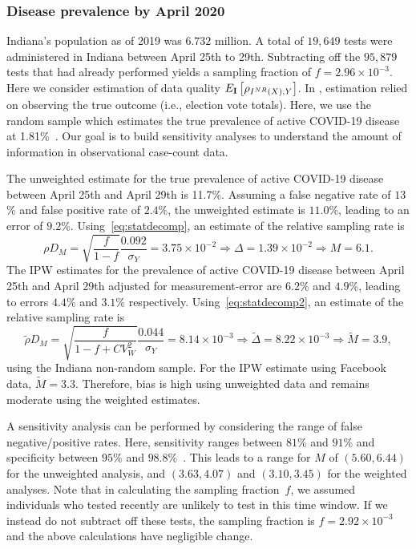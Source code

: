 \documentclass[11pt]{amsart}
\numberwithin{equation}{section}
\theoremstyle{plain}
\def\I{\bf I}
\begin{document}
 \subsubsection{Disease prevalence by April 2020}

 Indiana's population as of 2019 was $6.732$ million.  A total of $19,649$ tests were administered in Indiana between April 25th to 29th. Subtracting off the $95,879$ tests that had already performed yields a sampling fraction of $f = 2.96 \times 10^{-3}$. Here we consider estimation of data quality $E_{\I} \left[ \rho_{I^{NR} (X),Y} \right]$. In \cite{Meng2018}, estimation relied on observing the true outcome (i.e., election vote totals). Here, we use the random sample which estimates the true prevalence of active COVID-19 disease at 1.81\%~\cite{Yiannoutsos2021}.  Our goal is to build sensitivity analyses to understand the amount of information in observational case-count data.

 The unweighted estimate for the true prevalence of active COVID-19 disease between April 25th and April 29th is 11.7\%.  Assuming a false negative rate of $13$\% and false positive rate of $2.4$\%, the unweighted estimate is $11.0$\%, leading to an error of $9.2$\%.  Using~\eqref{eq:statdecomp}, an estimate of the relative sampling rate is
 \begin{equation*}
 \rho D_M = \sqrt{\frac{f}{1-f}} \frac{\text{0.092}}{\sigma_Y} = 3.75 \times 10^{-2} \Rightarrow \Delta = 1.39 \times 10^{-2} \Rightarrow M = 6.1.
 \end{equation*}
 The IPW estimates for the prevalence of active COVID-19 disease between April 25th and April 29th adjusted for measurement-error are $6.2$\% and $4.9$\%, leading to errors $4.4$\% and $3.1$\% respectively.  Using~\eqref{eq:statdecomp2}, an estimate of the relative sampling rate is
 \begin{equation*}
 \tilde \rho D_M = \sqrt{\frac{f}{1-f+CV_W^2}} \frac{\text{0.044}}{\sigma_Y} = 8.14 \times 10^{-3} \Rightarrow \tilde \Delta = 8.22 \times 10^{-3}  \Rightarrow \tilde M = 3.9,
 \end{equation*}
 using the Indiana non-random sample.  For the IPW estimate using Facebook data, $\tilde M = 3.3$. Therefore, bias is high using unweighted data and remains moderate using the weighted estimates.

 A sensitivity analysis can be performed by considering the range of false negative/positive rates.  Here, sensitivity ranges between $81$\% and $91$\% and specificity between $95$\% and $98.8$\%~\cite{Katz2020}. This leads to a range for $M$ of $(5.60, 6.44)$ for the unweighted analysis, and $(3.63,4.07)$ and $(3.10, 3.45)$ for the weighted analyses.  Note that in calculating the sampling fraction~$f$, we assumed individuals who tested recently are unlikely to test in this time window. If we instead do not subtract off these tests, the sampling fraction is $f = 2.92 \times 10^{-3}$ and the above calculations have negligible change.
\end{document}
